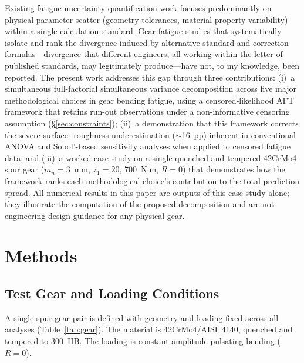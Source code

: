 \documentclass[twocolumn,12pt,a4paper]{article}
\begin{document}
Existing fatigue uncertainty quantification work focuses predominantly
on physical parameter scatter (geometry tolerances, material property
variability) within a single calculation standard. Gear fatigue studies
that systematically isolate and rank the divergence induced by
alternative standard and correction formulas---divergence that different
engineers, all working within the letter of published standards, may
legitimately produce---have not, to my knowledge, been reported. The
present work addresses this gap through three contributions: (i)~a simultaneous
full-factorial
simultaneous variance decomposition across five major methodological
choices in gear bending fatigue, using a censored-likelihood AFT
framework that retains run-out observations under a non-informative censoring assumption (\S\ref{sec:constraints});
(ii)~a demonstration that this framework corrects the severe surface-
roughness underestimation ($\sim$16~pp) inherent in conventional
ANOVA and Sobol'-based sensitivity analyses when applied to censored
fatigue data; and (iii)~a worked case study on a single
quenched-and-tempered 42CrMo4 spur gear ($m_n=3$~mm, $z_1=20$,
700~N$\cdot$m, $R=0$) that demonstrates how the framework ranks each
methodological choice's contribution to the total prediction spread.
All numerical results in this paper are outputs of this case study
alone; they illustrate the computation of the proposed decomposition
and are not engineering design guidance for any physical gear.

\section{Methods}
\label{sec:methods}

\subsection{Test Gear and Loading Conditions}

A single spur gear pair is defined with geometry and loading fixed
across all analyses (Table~\ref{tab:gear}). The material is
42CrMo4/AISI~4140, quenched and tempered to 300~HB. The loading is
constant-amplitude pulsating bending ($R=0$).
\end{document}
